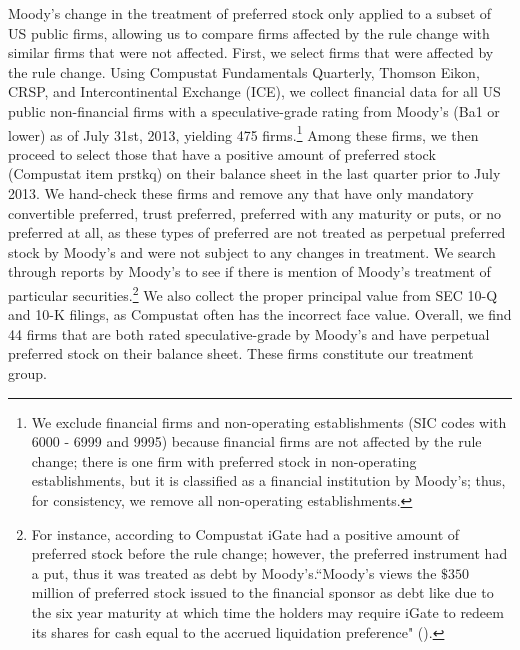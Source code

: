 \documentclass[a4paper, 12pt]{article}
\begin{document}
Moody's change in the treatment of preferred stock only applied to a subset of US public firms, allowing us to compare firms affected by the rule change with similar firms that were not affected. First, we select firms that were affected by the rule change. Using Compustat Fundamentals Quarterly, Thomson Eikon, CRSP, and Intercontinental Exchange (ICE), we collect financial data for all US public non-financial firms with a speculative-grade rating from Moody's (Ba1 or lower) as of July 31st, 2013, yielding 475 firms.\footnote{We exclude financial firms and non-operating establishments (SIC codes with 6000 - 6999 and 9995) because financial firms are not affected by the rule change; there is one firm with preferred stock in non-operating establishments, but it is classified as a financial institution by Moody's; thus, for consistency, we remove all non-operating establishments.} Among these firms, we then proceed to select those that have a positive amount of preferred stock (Compustat item prstkq) on their balance sheet in the last quarter prior to July 2013. We hand-check these firms and remove any that have only mandatory convertible preferred, trust preferred, preferred with any maturity or puts, or no preferred at all, as these types of preferred are not treated as perpetual preferred stock by Moody's and were not subject to any changes in treatment. We search through reports by Moody's to see if there is mention of Moody's treatment of particular securities.\footnote{For instance, according to Compustat iGate had a positive amount of preferred stock before the rule change; however, the preferred instrument had a put, thus it was treated as debt by Moody's.``Moody's views the $\$350$ million of preferred stock issued to the financial sponsor as debt like due to the six year maturity at which time the holders may require iGate to redeem its shares for cash equal to the accrued liquidation preference" (\citealp{moodyassigns}).} We also collect the proper principal value from SEC 10-Q and 10-K filings, as Compustat often has the incorrect face value. Overall, we find 44 firms that are both rated speculative-grade by Moody's and have perpetual preferred stock on their balance sheet. These firms constitute our treatment group.
\end{document}
